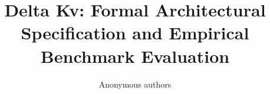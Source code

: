 \title{\textbf{Delta Kv: Formal Architectural Specification and Empirical Benchmark Evaluation}}

\author{Anonymous authors}

